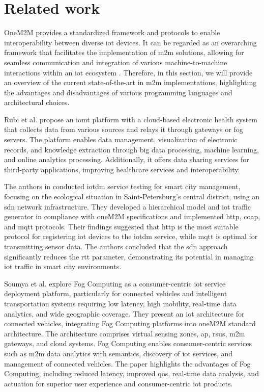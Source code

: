 \documentclass[a4paper,fleqn]{cas-dc}
\begin{document}
\section{Related work}
\label{relatedWork}

OneM2M provides a standardized framework and protocols to enable interoperability between diverse \gls{iot} devices. It can be regarded as an overarching framework that facilitates the implementation of \gls{m2m} solutions, allowing for seamless communication and integration of various machine-to-machine interactions within an \gls{iot} ecosystem \cite{onem2m_standard}. Therefore, in this section, we will provide an overview of the current state-of-the-art in \gls{m2m} implementations, highlighting the advantages and disadvantages of various programming languages and architectural choices.

Rubi et al. \cite{Rubi2019} propose an \gls{iomt} platform with a cloud-based electronic health system that collects data from various sources and relays it through gateways or fog servers. The platform enables data management, visualization of electronic records, and knowledge extraction through big data processing, machine learning, and online analytics processing. Additionally, it offers data sharing services for third-party applications, improving healthcare services and interoperability.

The authors in \cite{Volkov2017} conducted \gls{iotdm} service testing for smart city management, focusing on the ecological situation in Saint-Petersburg's central district, using an \gls{sdn} network infrastructure. They developed a hierarchical model and \gls{iot} traffic generator in compliance with oneM2M specifications and implemented \gls{http}, \gls{coap}, and \gls{mqtt} protocols. Their findings suggested that \gls{http} is the most suitable protocol for registering \gls{iot} devices to the \gls{iotdm} service, while \gls{mqtt} is optimal for transmitting sensor data. The authors concluded that the \gls{sdn} approach significantly reduces the \gls{rtt} parameter, demonstrating its potential in managing \gls{iot} traffic in smart city environments.

Soumya et al. \cite{Datta2015} explore Fog Computing as a consumer-centric \gls{iot} service deployment platform, particularly for connected vehicles and intelligent transportation systems requiring low latency, high mobility, real-time data analytics, and wide geographic coverage. They present an \gls{iot} architecture for connected vehicles, integrating Fog Computing platforms into oneM2M standard architecture. The architecture comprises virtual sensing zones, \gls{ap}, \gls{rsus}, \gls{m2m} gateways, and cloud systems. Fog Computing enables consumer-centric services such as \gls{m2m} data analytics with semantics, discovery of \gls{iot} services, and management of connected vehicles. The paper highlights the advantages of Fog Computing, including reduced latency, improved \gls{qos}, real-time data analysis, and actuation for superior user experience and consumer-centric \gls{iot} products.
\end{document}
